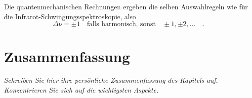 Die quantenmechanischen Rechnungen ergeben die selben Auswahlregeln wie für die Infrarot-Schwingungsspektroskopie, also 
\begin{equation}
 \Delta \nu = \pm 1 \quad \text{falls harmonisch, sonst} \quad \pm 1, \pm 2, \dots   \quad .
\end{equation}







\section{Zusammenfassung}

\textit{Schreiben Sie hier ihre persönliche Zusammenfassung des Kapitels auf. Konzentrieren Sie sich auf die wichtigsten Aspekte.}

\vspace*{10cm}


\printbibliography[segment=\therefsegment,heading=subbibliography]
